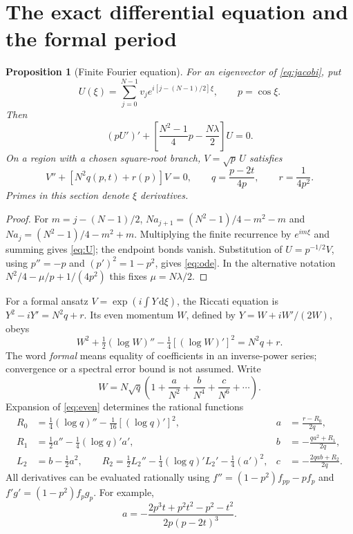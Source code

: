 \documentclass[10pt]{article}
\newtheorem{proposition}{Proposition}
\newcommand{\dd}{\mathrm d}
\begin{document}
\section{The exact differential equation and the formal period}
\begin{proposition}[Finite Fourier equation]
For an eigenvector of \eqref{eq:jacobi}, put
\[
 U(\xi)=\sum_{j=0}^{N-1}v_j e^{i[j-(N-1)/2]\xi},\qquad p=\cos\xi.
\]
Then
\begin{equation}
 (pU')'+\left[\frac{N^2-1}{4}p-\frac{N\lambda}{2}\right]U=0.
 \label{eq:U}
\end{equation}
On a region with a chosen square-root branch, $V=\sqrt p\,U$ satisfies
\begin{equation}
 V''+[N^2q(p,t)+r(p)]V=0,\qquad
 q=\frac{p-2t}{4p},\qquad r=\frac1{4p^2}.
 \label{eq:ode}
\end{equation}
Primes in this section denote $\xi$ derivatives.
\end{proposition}
\begin{proof}
For $m=j-(N-1)/2$,
$Na_{j+1}=(N^2-1)/4-m^2-m$ and $Na_j=(N^2-1)/4-m^2+m$.
Multiplying the finite recurrence by $e^{im\xi}$ and summing gives \eqref{eq:U}; the endpoint bonds vanish. Substitution of $U=p^{-1/2}V$, using $p''=-p$ and $(p')^2=1-p^2$, gives \eqref{eq:ode}. In the alternative notation $N^2/4-\mu/p+1/(4p^2)$ this fixes $\mu=N\lambda/2$.
\end{proof}

For a formal ansatz $V=\exp(i\int Y\,\dd\xi)$, the Riccati equation is
$Y^2-iY'=N^2q+r$. Its even momentum $W$, defined by
$Y=W+iW'/(2W)$, obeys
\begin{equation}
 W^2+\tfrac12(\log W)''-\tfrac14[(\log W)']^2=N^2q+r.
 \label{eq:even}
\end{equation}
The word \emph{formal} means equality of coefficients in an inverse-power series; convergence or a spectral error bound is not assumed. Write
\begin{equation}
 W=N\sqrt q\left(1+\frac a{N^2}+\frac b{N^4}+\frac c{N^6}+\cdots\right).
 \label{eq:wkb}
\end{equation}
Expansion of \eqref{eq:even} determines the rational functions
\begin{align}
 R_0&=\tfrac14(\log q)''-\tfrac1{16}[(\log q)']^2,
 &a&=\frac{r-R_0}{2q},\nonumber\\
 R_1&=\tfrac12a''-\tfrac14(\log q)'a',
 &b&=-\frac{qa^2+R_1}{2q},\nonumber\\
 L_2&=b-\tfrac12a^2,\qquad
 R_2=\tfrac12L_2''-\tfrac14(\log q)'L_2'-\tfrac14(a')^2,
 &c&=-\frac{2qab+R_2}{2q}.
 \label{eq:recursion}
\end{align}
All derivatives can be evaluated rationally using
$f''=(1-p^2)f_{pp}-pf_p$ and $f'g'=(1-p^2)f_pg_p$. For example,
\begin{equation}
 a=-\frac{2p^3t+p^2t^2-p^2-t^2}{2p(p-2t)^3}.
 \label{eq:a}
\end{equation}
\end{document}
